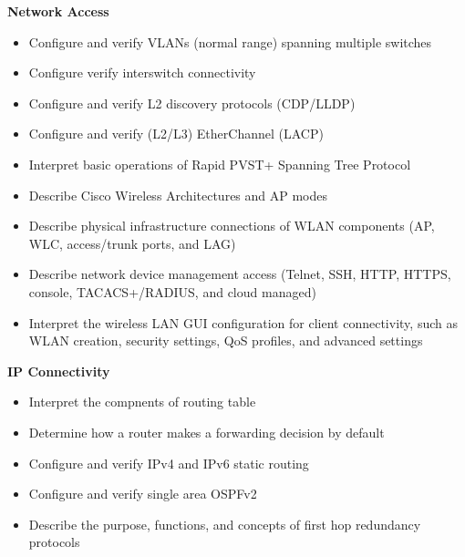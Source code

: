 \documentclass{article}
\begin{document}
\begin{flushleft}\textbf{Network Access}\end{flushleft}
\begin{itemize}
  \item Configure and verify VLANs (normal range) spanning multiple switches
  \item Configure verify interswitch connectivity
  \item Configure and verify L2 discovery protocols (CDP/LLDP)
  \item Configure and verify (L2/L3) EtherChannel (LACP)
  \item Interpret basic operations of Rapid PVST+ Spanning Tree Protocol
  \item Describe Cisco Wireless Architectures and AP modes
  \item Describe physical infrastructure connections of WLAN components (AP, WLC, access/trunk ports, and LAG)
  \item Describe network device management access (Telnet, SSH, HTTP, HTTPS, console, TACACS+/RADIUS, and cloud managed)
  \item Interpret the wireless LAN GUI configuration for client connectivity, such as WLAN creation, security settings, QoS profiles, and advanced settings\\
\end{itemize}



\begin{flushleft}\textbf{IP Connectivity}\end{flushleft}
\begin{itemize}
  \item Interpret the compnents of routing table
  \item Determine how a router makes a forwarding decision by default
  \item Configure and verify IPv4 and IPv6 static routing 
  \item Configure and verify single area OSPFv2
  \item Describe the purpose, functions, and concepts of first hop redundancy protocols\\
\end{itemize}
\end{document}
